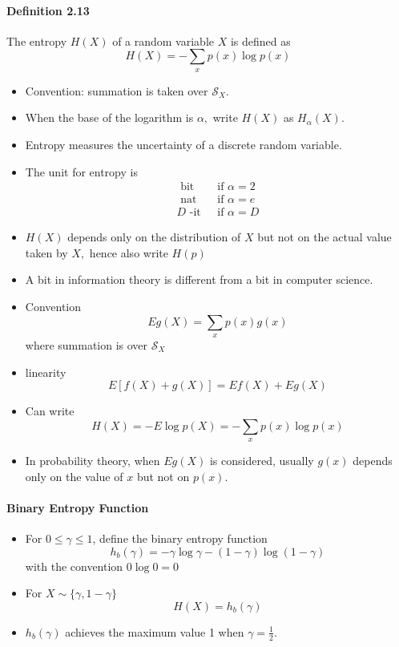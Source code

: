 \documentclass[8pt]{article}
\begin{document}
\paragraph{Definition 2.13} The entropy $H(X)$ of a random variable $X$ is defined as
$$
H(X)=-\sum_{x} p(x) \log p(x)
$$
\begin{itemize}
	\item Convention: summation is taken over $\mathcal{S}_{X}$.
	\item When the base of the logarithm is $\alpha,$ write $H(X)$ as $H_{\alpha}(X)$.
	\item Entropy measures the uncertainty of a discrete random variable.
	\item The unit for entropy is
			$$
			\begin{array}{ll}
			\text { bit } & \text { if } \alpha=2 \\
			\text { nat } & \text { if } \alpha=e \\
			D \text { -it } & \text { if } \alpha=D
			\end{array}
			$$
	\item $H(X)$ depends only on the distribution of $X$ but not on the actual value taken by $X,$ hence also write $H(p)$
	\item A bit in information theory is different from a bit in computer science.
	\item Convention
		$$
		E g(X)=\sum_{x} p(x) g(x)
		$$
		where summation is over $\mathcal{S}_{X}$
	\item linearity
		$$
		E[f(X)+g(X)]=E f(X)+E g(X)
		$$
	\item Can write
$$
H(X)=-E \log p(X)=-\sum_{x} p(x) \log p(x)
$$
	\item In probability theory, when $E g(X)$ is considered, usually $g(x)$ depends only on the value of $x$ but not on $p(x)$.
\end{itemize}

\paragraph{Binary Entropy Function}
\begin{itemize}
	\item For $0 \leq \gamma \leq 1$, define the binary entropy function
	$$
	h_{b}(\gamma)=-\gamma \log \gamma-(1-\gamma) \log (1-\gamma)
	$$
	with the convention $0 \log 0=0$
	\item For $X \sim\{\gamma, 1-\gamma\}$
	$$
	H(X)=h_{b}(\gamma)
	$$
	\item  $h_{b}(\gamma)$ achieves the maximum value 1 when $\gamma=\frac{1}{2}$.
\end{itemize}
\end{document}
